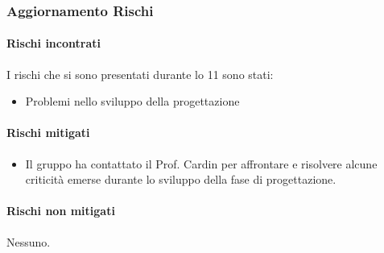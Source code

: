\subsubsection{Aggiornamento Rischi}
\label{sec:aggiornamento_rischi_sprint11}

\paragraph{Rischi incontrati}
\label{par:rischi_incontrati_sprint11}
I rischi che si sono presentati durante lo  11 sono stati:
\begin{itemize}
    \item Problemi nello sviluppo della progettazione
\end{itemize}

\paragraph{Rischi mitigati}
\label{par:rischi_mitigati_sprint11}
\begin{itemize}
    \item Il gruppo ha contattato il Prof. Cardin per affrontare e risolvere alcune criticità emerse durante lo sviluppo della fase di progettazione.
\end{itemize}

\paragraph{Rischi non mitigati}
\label{par:rischi_non_mitigati_sprint11}
Nessuno.

